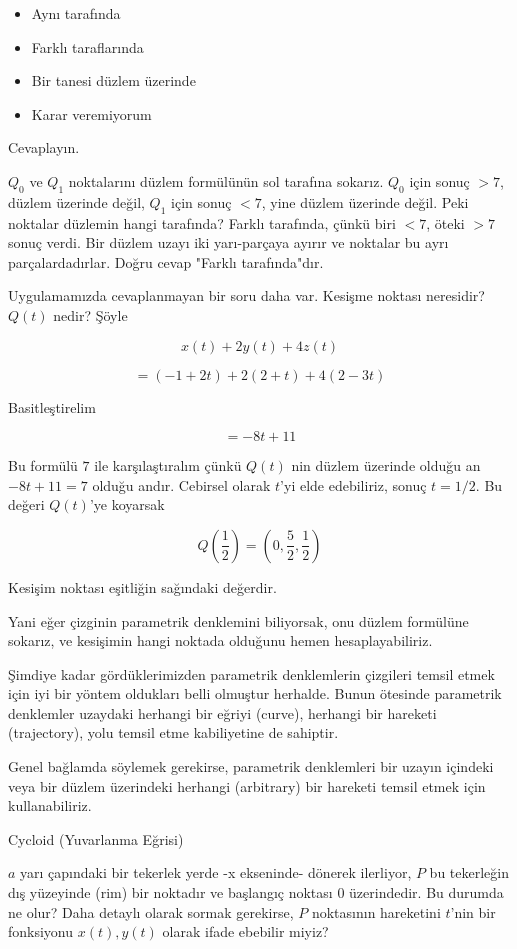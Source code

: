\documentclass[12pt,fleqn]{article}\usepackage{../../common}
\begin{document}
\begin{itemize}
   \item Aynı tarafında
   \item Farklı taraflarında
   \item Bir tanesi düzlem üzerinde
   \item Karar veremiyorum
\end{itemize}

Cevaplayın. 

$Q_0$ ve $Q_1$ noktalarını düzlem formülünün sol tarafına sokarız. $Q_0$ için
sonuç $>7$, düzlem üzerinde değil, $Q_1$ için sonuç $<7$, yine düzlem üzerinde
değil. Peki noktalar düzlemin hangi tarafında? Farklı tarafında, çünkü biri
$<7$, öteki $>7$ sonuç verdi. Bir düzlem uzayı iki yarı-parçaya ayırır ve
noktalar bu ayrı parçalardadırlar. Doğru cevap "Farklı tarafında"dır.

Uygulamamızda cevaplanmayan bir soru daha var. Kesişme noktası neresidir?
$Q(t)$ nedir? Şöyle

$$ x(t) + 2y(t) + 4z(t) $$

$$ = (-1+2t) + 2(2+t) + 4(2-3t) $$

Basitleştirelim

$$ = -8t + 11 $$

Bu formülü $7$ ile karşılaştıralım çünkü $Q(t)$ nin düzlem üzerinde olduğu
an $-8t + 11 = 7$ olduğu andır. Cebirsel olarak $t$'yi elde edebiliriz,
sonuç $t=1/2$. Bu değeri $Q(t)$'ye koyarsak

$$ Q(\frac{1}{2}) = (0,\frac{5}{2},\frac{1}{2}) $$

Kesişim noktası eşitliğin sağındaki değerdir.

Yani eğer çizginin parametrik denklemini biliyorsak, onu düzlem formülüne
sokarız, ve kesişimin hangi noktada olduğunu hemen hesaplayabiliriz. 

Şimdiye kadar gördüklerimizden parametrik denklemlerin çizgileri temsil
etmek için iyi bir yöntem oldukları belli olmuştur herhalde. Bunun ötesinde
parametrik denklemler uzaydaki herhangi bir eğriyi (curve), herhangi bir
hareketi (trajectory), yolu temsil etme kabiliyetine de sahiptir. 

Genel bağlamda söylemek gerekirse, parametrik denklemleri bir uzayın içindeki 
veya bir
düzlem üzerindeki herhangi (arbitrary) bir hareketi temsil etmek için
kullanabiliriz.

Cycloid (Yuvarlanma Eğrisi)

$a$ yarı çapındaki bir tekerlek yerde -x ekseninde- dönerek ilerliyor, $P$ bu
tekerleğin dış yüzeyinde (rim) bir noktadır ve başlangıç noktası 0 üzerindedir.
Bu durumda ne olur? Daha detaylı olarak sormak gerekirse, $P$ noktasının
hareketini $t$'nin bir fonksiyonu $x(t),y(t)$ olarak ifade ebebilir miyiz?
\end{document}
